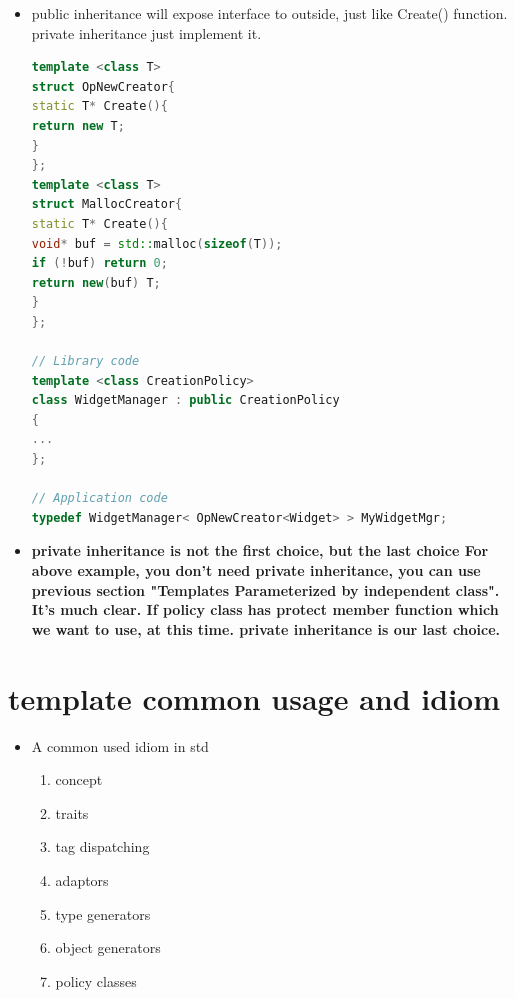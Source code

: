 \documentclass[a4paper,12pt,twoside]{book}
\begin{document}
\begin{itemize}
\item public inheritance will expose interface to outside, just like Create() function. private inheritance just implement it. 

\begin{lstlisting}[frame=single, language=c++]
template <class T>
struct OpNewCreator{
static T* Create(){
return new T;
}
};
template <class T>
struct MallocCreator{
static T* Create(){
void* buf = std::malloc(sizeof(T));
if (!buf) return 0;
return new(buf) T;
}
}; 

// Library code
template <class CreationPolicy>
class WidgetManager : public CreationPolicy
{
...
}; 

// Application code
typedef WidgetManager< OpNewCreator<Widget> > MyWidgetMgr; 
\end{lstlisting}

\item \textbf{private inheritance is not the first choice, but the last choice For above example, you don't need private inheritance, you can use previous section "Templates Parameterized by independent class". It's much clear. If policy class has protect member function which we want to use, at this time. private inheritance is our last choice. }
\end{itemize}



\section{template common usage and idiom}
\begin{itemize}
	
	\item A common used idiom in std
	\begin{enumerate}
		\item concept
		\item traits
		\item tag dispatching
		\item adaptors
		\item type generators
		\item object generators
		\item policy classes
	\end{enumerate}
\end{itemize}
\end{document}
